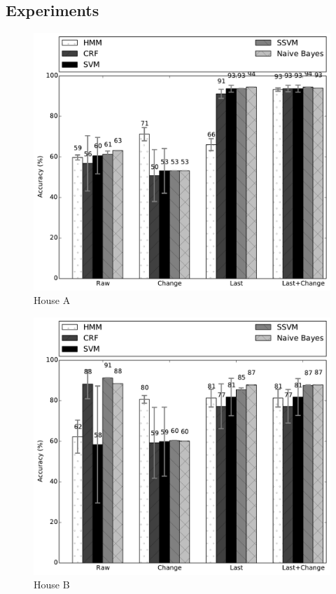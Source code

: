 \subsection{Experiments}
\begin{figure}[t!]
\begin{center}
\includegraphics[width=5in]{../../src/reports/A.pdf}
\end{center}
\vspace{-0.5cm}
\caption{House A}
\label{fig:house_a}
\vspace{-0.5cm}
\end{figure}

\begin{figure}[t!]
\begin{center}
\includegraphics[width=5in]{../../src/reports/B.pdf}
\end{center}
\vspace{-0.5cm}
\caption{House B}
\label{fig:house_b}
\vspace{-0.5cm}
\end{figure}

